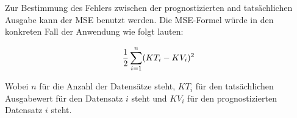 Zur Bestimmung des Fehlers zwischen der prognostizierten and tatsächlichen Ausgabe kann der MSE benutzt werden. Die MSE-Formel würde in den konkreten Fall der Anwendung wie folgt lauten:

\begin{equation}\formelentry{MSE zur Berechnung der Abweichung}
   \frac{1}{2}\sum^{n}_{i=1} (KT_{i} - KV_{i})^2
\end{equation}

Wobei $n$ für die Anzahl der Datensätze steht, $KT_i$ für den tatsächlichen Ausgabewert für den Datensatz $i$ steht und $KV_i$ für den prognostizierten Datensatz $i$ steht.

